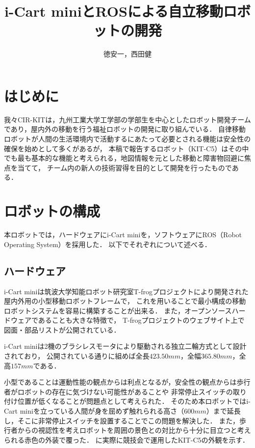 \documentclass[twocolumn,10pt,a4paper]{jsarticle}
\title{i-Cart miniとROSによる自立移動ロボットの開発}
\author{徳安一，西田健}
\date{}
\begin{document}
  \maketitle

\section{はじめに} 
  我々CIR-KITは，九州工業大学工学部の学部生を中心としたロボット開発チームであり，屋内外の移動を行う福祉ロボットの開発に取り組んでいる．
  自律移動ロボットが人間の生活環境内で活動するにあたって必要とされる機能は安全性の確保を始めとして多くがあるが，
  本稿で報告するロボット（KIT-C5）はその中でも最も基本的な機能と考えられる，地図情報を元とした移動と障害物回避に焦点を当てて，
  チーム内の新人の技術習得を目的として開発を行ったものである．\\

\section{ロボットの構成} 
  本ロボットでは，ハードウェアにi-Cart miniを，ソフトウェアにROS（Robot Operating System）を採用した． %
  以下でそれぞれについて述べる．\\

\subsection{ハードウェア}
  i-Cart miniは筑波大学知能ロボット研究室T-frogプロジェクトにより開発された屋内外用の小型移動ロボットフレームで，
  これを用いることで最小構成の移動ロボットシステムを容易に構築することが出来る．
  また，オープンソースハードウェアであることも大きな特徴で，
  T-frogプロジェクトのウェブサイト\cite{icart}上で図面・部品リストが公開されている．

  i-Cart miniは2機のブラシレスモータにより駆動される独立二輪方式として設計されており，
  公開されている通りに組めば全長$423.50 \unit{mm}$，全幅$365.80 \unit{mm}$，全高$157 \unit{mm}$である．

  小型であることは運動性能の観点からは利点となるが，安全性の観点からは歩行者がロボットの存在に気づけない可能性があることや
  非常停止スイッチの取り付け位置が低くなることが問題点として考えられた．
  そのため本ロボットではi-Cart miniを立っている人間が身を屈めず触れられる高さ（$600 \unit{mm}$）まで延長し，そこに非常停止スイッチを設置することでこの問題を解決した．
  また，歩行者からの視認性を考えロボットを周囲の景色との対比から十分に目立つと考えられる赤色の外装で覆った．
  に実際に競技会で運用したKIT-C5の外観を示す．\\
\end{document}
